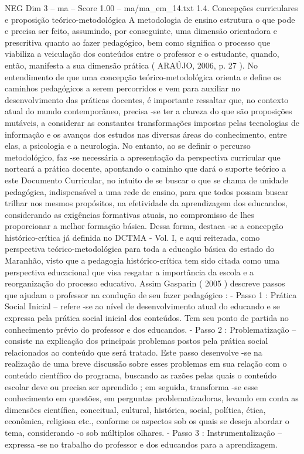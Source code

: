 \begin{textsample}{NEG Dim 3 – ma – Score 1.00 – ma/ma\_em\_14.txt}  \label{ex:f3_neg_146}
1.4.
Concepções curriculares e proposição teórico-metodológica A metodologia de ensino estrutura o que pode e precisa ser feito, assumindo, por conseguinte, uma dimensão orientadora e prescritiva quanto ao fazer pedagógico, bem como significa o processo que viabiliza a veiculação dos conteúdos entre o professor e o estudante, quando, então, manifesta a sua dimensão prática ( ARAÚJO, 2006, p. 27 ).
No entendimento de que uma concepção teórico-metodológica orienta e define os caminhos pedagógicos a serem percorridos e vem para auxiliar no desenvolvimento das práticas docentes, é importante ressaltar que, no contexto atual do mundo contemporâneo, precisa -se ter a clareza do que são proposições mutáveis, a considerar as constantes transformações impostas pelas tecnologias de informação e os avanços dos estudos nas diversas áreas do conhecimento, entre elas, a psicologia e a neurologia.
No entanto, ao se definir o percurso metodológico, faz -se necessária a apresentação da perspectiva curricular que norteará a prática docente, apontando o caminho que dará o suporte teórico a este Documento Curricular, no intuito de se buscar o que se chama de unidade pedagógica, indispensável a uma rede de ensino, para que todos possam buscar trilhar nos mesmos propósitos, na efetividade da aprendizagem dos educandos, considerando as exigências formativas atuais, no compromisso de lhes proporcionar a melhor formação básica.
Dessa forma, destaca -se a concepção histórico-crítica já definida no DCTMA - Vol.
I, e aqui reiterada, como perspectiva teórico-metodológica para toda a educação básica do estado do Maranhão, visto que a pedagogia histórico-crítica tem sido citada como uma perspectiva educacional que visa resgatar a importância da escola e a reorganização do processo educativo.
Assim Gasparin ( 2005 ) descreve passos que ajudam o professor na condução de seu fazer pedagógico : - Passo 1 : Prática Social Inicial – refere -se ao nível de desenvolvimento atual do educando e se expressa pela prática social inicial dos conteúdos.
Tem seu ponto de partida no conhecimento prévio do professor e dos educandos. - Passo 2 : Problematização – consiste na explicação dos principais problemas postos pela prática social relacionados ao conteúdo que será tratado.
Este passo desenvolve -se na realização de uma breve discussão sobre esses problemas em sua relação com o conteúdo científico do programa, buscando as razões pelas quais o conteúdo escolar deve ou precisa ser aprendido ; em seguida, transforma -se esse conhecimento em questões, em perguntas problematizadoras, levando em conta as dimensões científica, conceitual, cultural, histórica, social, política, ética, econômica, religiosa etc., conforme os aspectos sob os quais se deseja abordar o tema, considerando -o sob múltiplos olhares. - Passo 3 : Instrumentalização – expressa -se no trabalho do professor e dos educandos para a aprendizagem.

\end{textsample}

